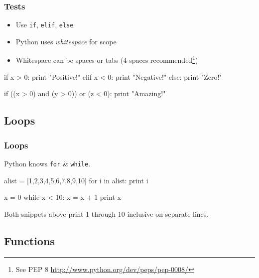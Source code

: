 \documentclass[xetex,10pt]{beamer}
\def\pythoni{\lstinline[language=pythontim]}
\def\spacer{\vspace*{1em}}
\begin{document}
\begin{frame}[fragile]
	\frametitle{Tests}

	\begin{itemize}
	\item Use \pythoni{if}, \pythoni{elif}, \pythoni{else}
	\item Python uses \emph{whitespace} for scope
	\item Whitespace can be spaces or tabs (4 spaces recommended\footnote[frame]{See PEP 8 \url{http://www.python.org/dev/peps/pep-0008/}})
	\end{itemize}
\pause

\begin{python}
if x > 0:
    print "Positive!"
elif x < 0:
    print "Negative!"
else:
    print "Zero!"
\end{python}

	\spacer
\pause

\begin{python}
if ((x > 0) and (y > 0)) or (z < 0):
    print "Amazing!"
\end{python}

\end{frame}

\subsection{Loops}

\begin{frame}[fragile]
	\frametitle{Loops}
	Python knows \pythoni{for} \& \pythoni{while}.
	\spacer
	\pause

\begin{python}
alist = [1,2,3,4,5,6,7,8,9,10]
for i in alist:
    print i
\end{python}

	\spacer
	\pause

\begin{python}
x = 0
while x < 10:
    x = x + 1
    print x
\end{python}

	\spacer


Both snippets above print 1 through 10 inclusive on separate lines.

\end{frame}

\subsection{Functions}
\end{document}

